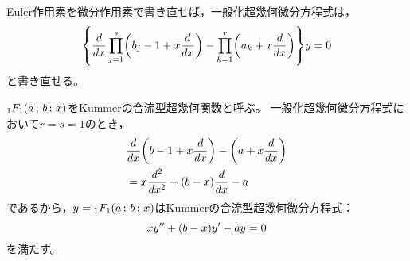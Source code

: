 \documentclass[a4paper,draft]{ltjsarticle}
\begin{document}
Euler作用素を微分作用素で書き直せば，一般化超幾何微分方程式は，
\begin{equation}
    \bra{
        \diff{}{x}\prod_{j=1}^s\pare{b_j-1+x\diff{}{x}}
        -\prod_{k=1}^r\pare{a_k+x\diff{}{x}}
    }y=0
\end{equation}
と書き直せる。

\begin{eg}[Kummerの合流型超幾何微分方程式]
    $\spfq{1}{1}{a}{b}{x}$をKummerの合流型超幾何関数と呼ぶ。
    一般化超幾何微分方程式において$r=s=1$のとき，
    \begin{align}
        &\diff{}{x}\pare{b-1+x\diff{}{x}}-\pare{a+x\diff{}{x}}
        \\
        &=x\diffn{}{x}{2}+\pare{b-x}\diff{}{x}-a
    \end{align}
    であるから，$y=\spfq{1}{1}{a}{b}{x}$はKummerの合流型超幾何微分方程式：
    \begin{equation}
        xy''+\pare{b-x}y'-ay=0
    \end{equation}
    を満たす。
\end{eg}
\end{document}
